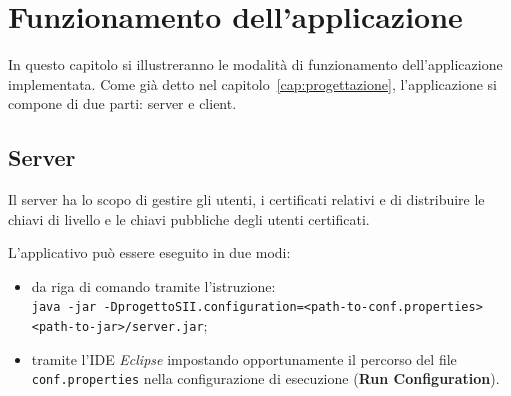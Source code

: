 \chapter{Funzionamento dell'applicazione}
	\label{cap:funzionamento}		
In questo capitolo si illustreranno le modalità di funzionamento dell'applicazione implementata.
Come già detto nel capitolo~\ref{cap:progettazione}, l'applicazione si compone di due parti: server e client.

\section{Server}

Il server ha lo scopo di gestire gli utenti, i certificati relativi e di distribuire le chiavi di livello e le chiavi pubbliche degli utenti certificati.

L'applicativo può essere eseguito in due modi:
\begin{itemize}
	\item da riga di comando tramite l'istruzione:\\ \texttt{java -jar -DprogettoSII.configuration=<path-to-conf.properties> <path-to-jar>/server.jar};
	\item tramite l'IDE \emph{Eclipse} impostando opportunamente il percorso del file \texttt{conf.properties} nella configurazione di esecuzione (\textbf{Run Configuration}).  
\end{itemize}


